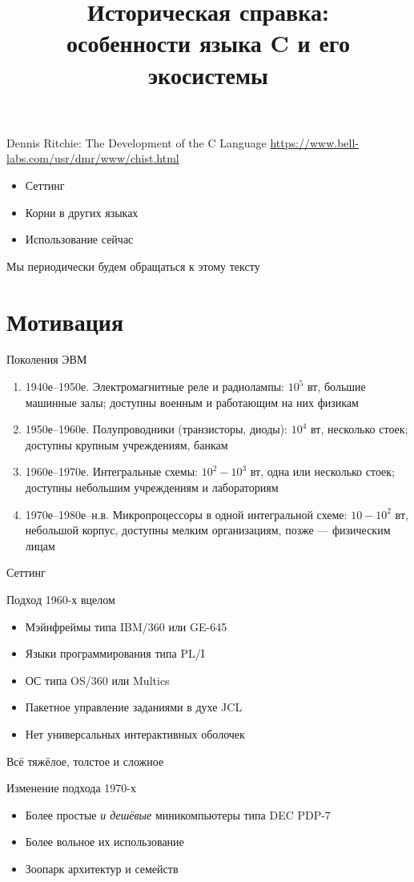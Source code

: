 \documentclass[xetex,aspectratio=169]{beamer}
\title[История C]{Историческая справка:\\особенности языка C и его экосистемы}
\begin{document}
\titleslide

\tocslide

\begin{frame}{Dennis Ritchie: The Development of the C Language}
	\url{https://www.bell-labs.com/usr/dmr/www/chist.html}
	\begin{itemize}
		\item Сеттинг
		\item Корни в других языках
		\item Использование сейчас
	\end{itemize}
	Мы периодически будем обращаться к этому тексту
\end{frame}

\section{Мотивация}

\begin{frame}{Поколения ЭВМ}
	\begin{enumerate}
		\item 1940е--1950е. Электромагнитные реле и радиолампы: $10^5$ вт, большие машинные залы; доступны военным и работающим на них физикам
		\item 1950е--1960е. Полупроводники (транзисторы, диоды): $10^4$ вт, несколько стоек; доступны крупным учреждениям, банкам
		\item 1960е--1970е. Интегральные схемы: $10^2-10^3$ вт, одна или несколько стоек; доступны небольшим учреждениям и лабораториям
		\item 1970е--1980е--н.в. Микропроцессоры в одной интегральной схеме: $10-10^2$ вт, небольшой корпус, доступны мелким организациям, позже --- физическим лицам
	\end{enumerate}
\end{frame}

\begin{frame}{Сеттинг}
	\begin{block}{Подход 1960-х вцелом}
		\begin{itemize}
			\item Мэйнфреймы типа IBM/360 или GE-645
			\item Языки программирования типа PL/I
			\item ОС типа OS/360 или Multics
			\item Пакетное управление заданиями в духе JCL
			\item Нет универсальных интерактивных оболочек
		\end{itemize}
		Всё тяжёлое, толстое и сложное
	\end{block}
\pause
	\begin{block}{Изменение подхода 1970-х}
	\begin{itemize}
		\item Более простые \emph{и дешёвые} миникомпьютеры типа DEC PDP-7
		\item Более вольное их использование
		\item Зоопарк архитектур и семейств
	\end{itemize}
\end{block}
\end{frame}
\end{document}
